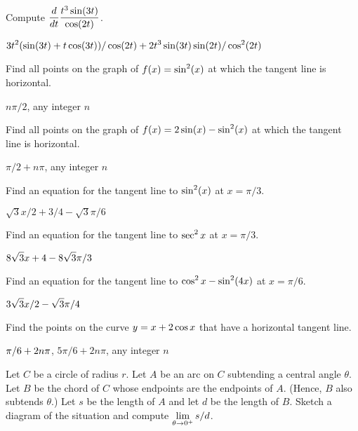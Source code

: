 \begin{exercises}
\exercise Compute $\displaystyle{d\over dt}{t^3 \sin (3t)\over\cos (2t)}$.
\begin{answer} $\displaystyle 3t^2(\sin(3t)+t\cos(3t))/\cos(2t)+2t^3\sin(3t)\sin(2t)/\cos^2(2t)$
\end{answer}

\exercise Find all points on the graph of
$\displaystyle f(x)=\sin^2(x)$ at which the tangent line is horizontal.
\begin{answer} $n\pi/2$, any integer $n$
\end{answer}

\exercise Find all points on the graph of $\displaystyle f(x) = 2\sin(x) -
\sin^2(x)$ at which the tangent line is horizontal.
\begin{answer} $\pi/2+n\pi$, any integer $n$
\end{answer}

\exercise Find an
 equation for the tangent line to $\displaystyle \sin^2(x)$ at 
$x=\pi/3$.
\begin{answer} $\sqrt3x/2+3/4-\sqrt3\pi/6$
\end{answer}

\exercise Find an equation for the tangent line to $\displaystyle \sec ^2 x$
at $x=\pi/3$.
\begin{answer} $\displaystyle 8\sqrt3x+4-8\sqrt3\pi/3$
\end{answer}

\exercise Find an equation for the tangent line to $\displaystyle \cos ^2 x -
\sin ^2 (4x)$ at $x=\pi/6$.
\begin{answer} $\displaystyle 3\sqrt3x/2-\sqrt3\pi/4$
\end{answer}

\exercise Find the points on the curve $\displaystyle y= x+ 2\cos x$ that have a
horizontal tangent line.
\begin{answer} $\displaystyle \pi/6+2n\pi$, $5\pi/6+2n\pi$, any integer $n$
\end{answer}

\exercise Let $C$ be a circle of radius $r$. Let $A$ be an arc on $C$
subtending a central angle $\theta$. Let $B$ be the chord of
$C$ whose endpoints are the endpoints of $A$. (Hence, $B$ also
subtends $\theta$.) Let $s$ be the length of $A$
and let $d$ be the length of $B$. Sketch a diagram of the situation
and compute $\displaystyle \lim_{\theta \to 0^+ } s/d$.

\end{exercises}

